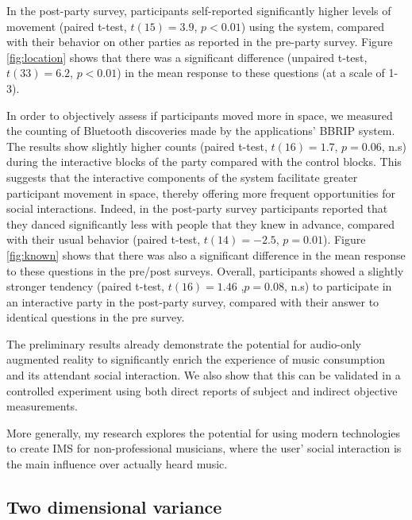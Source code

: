 \documentclass[a4paper,11pt]{article}
\begin{document}
{In the post-party survey, participants self-reported significantly higher levels of movement (paired t-test, $t(15)=3.9$, $p<0.01$) using the system, compared with their behavior on other parties as reported in the pre-party survey.
Figure \ref{fig:location} shows that there was a significant difference (unpaired t-test, $t(33)=6.2$, $p<0.01$) in the mean response to these questions (at a scale of 1-3).

In order to objectively assess if participants moved more in space, we measured the counting of Bluetooth discoveries made by the applications' BBRIP system.
The results show slightly higher counts (paired t-test, $t(16)=1.7$, $p=0.06$, n.s) during the interactive blocks of the party compared with the control blocks. This suggests that the interactive components of the system facilitate greater participant movement in space, thereby offering more frequent opportunities for social interactions.
Indeed, in the post-party survey participants reported that they danced significantly less with people that they knew in advance, compared with their usual behavior (paired t-test, $t(14)=-2.5$, $p=0.01$).
Figure \ref{fig:known} shows that there was also a significant difference in the mean response to these questions in the pre/post surveys.
Overall, participants showed a slightly stronger tendency (paired t-test, $t(16)=1.46$ ,$p=0.08$, n.s) to participate in an interactive party in the post-party survey, compared with their answer to identical questions in the pre survey.

The preliminary results already demonstrate the potential for audio-only augmented reality to significantly enrich the experience of music consumption and its attendant social interaction.
We also show that this can be validated in a controlled experiment using both direct reports of subject and indirect objective measurements.

More generally, my research explores the potential for using modern technologies to create IMS for non-professional musicians, where the user' social interaction is the main influence over actually heard music.

\begin{appendices}


\section{Two dimensional variance}


\end{appendices}}
\end{document}
